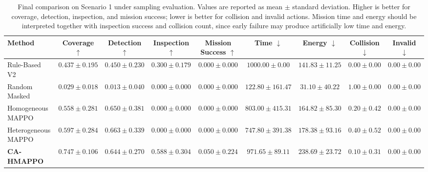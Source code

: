 \begin{table}[t]
\centering
\caption{Final comparison on Scenario 1 under sampling evaluation. Values are reported as mean $\pm$ standard deviation. Higher is better for coverage, detection, inspection, and mission success; lower is better for collision and invalid actions. Mission time and energy should be interpreted together with inspection success and collision count, since early failure may produce artificially low time and energy.}
\label{tab:final_comparison_scenario_1}
\begin{tabular}{lcccccccc}
\hline
Method & Coverage $\uparrow$ & Detection $\uparrow$ & Inspection $\uparrow$ & Mission Success $\uparrow$ & Time $\downarrow$ & Energy $\downarrow$ & Collision $\downarrow$ & Invalid $\downarrow$ \\
\hline
Rule-Based V2 & $0.437 \pm 0.195$ & $0.450 \pm 0.230$ & $0.300 \pm 0.179$ & $0.000 \pm 0.000$ & $1000.00 \pm 0.00$ & $141.83 \pm 11.25$ & $\mathbf{0.00 \pm 0.00}$ & $\mathbf{0.00 \pm 0.00}$ \\
Random Masked & $0.029 \pm 0.018$ & $0.013 \pm 0.040$ & $0.000 \pm 0.000$ & $0.000 \pm 0.000$ & $122.80 \pm 161.47$ & $31.10 \pm 40.22$ & $1.00 \pm 0.00$ & $\mathbf{0.00 \pm 0.00}$ \\
Homogeneous MAPPO & $0.558 \pm 0.281$ & $0.650 \pm 0.381$ & $0.000 \pm 0.000$ & $0.000 \pm 0.000$ & $803.00 \pm 415.31$ & $164.82 \pm 85.30$ & $0.20 \pm 0.42$ & $\mathbf{0.00 \pm 0.00}$ \\
Heterogeneous MAPPO & $0.597 \pm 0.284$ & $\mathbf{0.663 \pm 0.339}$ & $0.000 \pm 0.000$ & $0.000 \pm 0.000$ & $747.80 \pm 391.38$ & $178.38 \pm 93.16$ & $0.40 \pm 0.52$ & $\mathbf{0.00 \pm 0.00}$ \\
\textbf{CA-HMAPPO} & $\mathbf{0.747 \pm 0.106}$ & $0.644 \pm 0.270$ & $\mathbf{0.588 \pm 0.304}$ & $\mathbf{0.050 \pm 0.224}$ & $971.65 \pm 89.11$ & $238.69 \pm 23.72$ & $0.10 \pm 0.31$ & $\mathbf{0.00 \pm 0.00}$ \\
\hline
\end{tabular}
\end{table}
